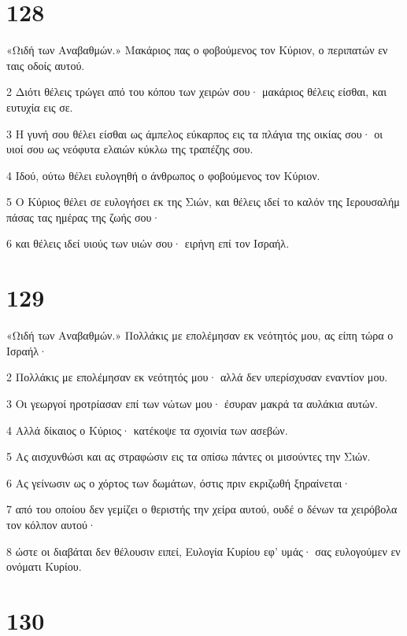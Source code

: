 \chapter{128}

\par «Ωιδή των Αναβαθμών.» Μακάριος πας ο φοβούμενος τον Κύριον, ο περιπατών εν ταις οδοίς αυτού.
\par 2 Διότι θέλεις τρώγει από του κόπου των χειρών σου· μακάριος θέλεις είσθαι, και ευτυχία εις σε.
\par 3 Η γυνή σου θέλει είσθαι ως άμπελος εύκαρπος εις τα πλάγια της οικίας σου· οι υιοί σου ως νεόφυτα ελαιών κύκλω της τραπέζης σου.
\par 4 Ιδού, ούτω θέλει ευλογηθή ο άνθρωπος ο φοβούμενος τον Κύριον.
\par 5 Ο Κύριος θέλει σε ευλογήσει εκ της Σιών, και θέλεις ιδεί το καλόν της Ιερουσαλήμ πάσας τας ημέρας της ζωής σου·
\par 6 και θέλεις ιδεί υιούς των υιών σου· ειρήνη επί τον Ισραήλ.

\chapter{129}

\par «Ωιδή των Αναβαθμών.» Πολλάκις με επολέμησαν εκ νεότητός μου, ας είπη τώρα ο Ισραήλ·
\par 2 Πολλάκις με επολέμησαν εκ νεότητός μου· αλλά δεν υπερίσχυσαν εναντίον μου.
\par 3 Οι γεωργοί ηροτρίασαν επί των νώτων μου· έσυραν μακρά τα αυλάκια αυτών.
\par 4 Αλλά δίκαιος ο Κύριος· κατέκοψε τα σχοινία των ασεβών.
\par 5 Ας αισχυνθώσι και ας στραφώσιν εις τα οπίσω πάντες οι μισούντες την Σιών.
\par 6 Ας γείνωσιν ως ο χόρτος των δωμάτων, όστις πριν εκριζωθή ξηραίνεται·
\par 7 από του οποίου δεν γεμίζει ο θεριστής την χείρα αυτού, ουδέ ο δένων τα χειρόβολα τον κόλπον αυτού·
\par 8 ώστε οι διαβάται δεν θέλουσιν ειπεί, Ευλογία Κυρίου εφ' υμάς· σας ευλογούμεν εν ονόματι Κυρίου.

\chapter{130}

